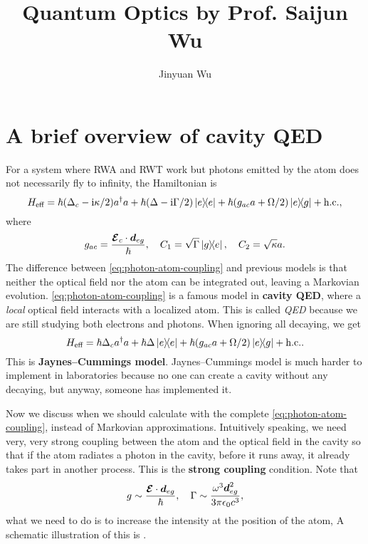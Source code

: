 \documentclass[hyperref, a4paper]{article}
\title{Quantum Optics by Prof. Saijun Wu}
\author{Jinyuan Wu}
\newcommand*{\ii}{\mathrm{i}}
\newcommand*{\concept}[1]{{\textbf{#1}}}
\begin{document}
\maketitle

\section{A brief overview of cavity QED}

For a system where RWA and RWT work but photons emitted by the atom does not necessarily fly to infinity, 
the Hamiltonian is 
\begin{equation}
    H_\text{eff} = \hbar (\Delta_c - \ii \kappa / 2) a^\dagger a + \hbar (\Delta - \ii \Gamma / 2) \dyad{e} + \hbar (g_{ac} a + \Omega / 2) \dyad{e}{g} + \text{h.c.},
    \label{eq:photon-atom-coupling}
\end{equation}
where 
\begin{equation}
    g_{ac} = \frac{\vb*{\mathcal{E}}_{c}\cdot \vb*{d}_{eg}}{\hbar}, \quad 
    C_1 = \sqrt{\Gamma} \dyad{g}{e}, \quad 
    C_2 = \sqrt{\kappa} a.
\end{equation}
The difference between \eqref{eq:photon-atom-coupling} and previous models is that neither the optical field nor 
the atom can be integrated out, leaving a Markovian evolution. \eqref{eq:photon-atom-coupling} is a famous model 
in \concept{cavity QED}, where a \emph{local} optical field interacts with a localized atom. This is called 
\emph{QED} because we are still studying both electrons and photons. When ignoring all decaying, we get 
\begin{equation}
    H_\text{eff} = \hbar \Delta_c a^\dagger a + \hbar \Delta \dyad{e} + \hbar (g_{ac} a + \Omega / 2) \dyad{e}{g} + \text{h.c.}.
\end{equation}
This is \concept{Jaynes–Cummings model}. Jaynes–Cummings model is much harder to implement in laboratories 
because no one can create a cavity without any decaying, but anyway, someone has implemented it.

Now we discuss when we should calculate with the complete \eqref{eq:photon-atom-coupling}, instead of 
Markovian approximations. Intuitively speaking, we need very, very strong coupling between the atom and 
the optical field in the cavity so that if the atom radiates a photon in the cavity, before it runs away,
it already takes part in another process. This is the \concept{strong coupling} condition. Note that 
\[
    g \sim \frac{\vb*{\mathcal{E}} \cdot \vb*{d}_{eg}}{\hbar}, \quad 
    \Gamma \sim \frac{\omega^3 \vb*{d}_{eg}^2}{3 \pi \epsilon_0 c^3},
\]
what we need to do is to increase the intensity at the position of the atom, A schematic illustration of 
this is .
\end{document}
